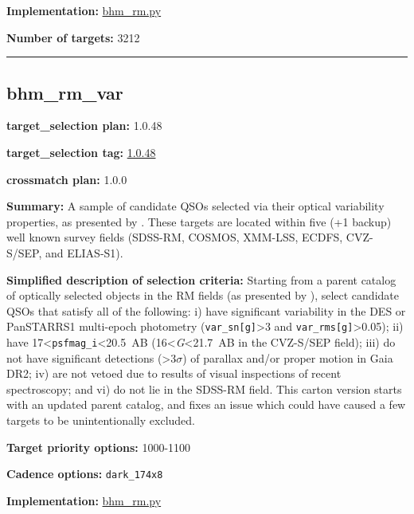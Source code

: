 \noindent\textbf{Implementation:}
\href{https://github.com/sdss/target_selection/blob/1.0.48/python/target_selection/cartons/bhm_rm.py}{bhm\_rm.py}

\noindent\textbf{Number of targets:} 3212

\begin{center}\rule{0.5\linewidth}{0.5pt}\end{center}

\hypertarget{bhm_rm_var_plan1.0.48}{%
\subsection{bhm\_rm\_var}\label{bhm_rm_var_plan1.0.48}}

\noindent\textbf{target\_selection plan:} 1.0.48

\noindent\textbf{target\_selection tag:}
\href{https://github.com/sdss/target_selection/tree/1.0.48/}{1.0.48}

\noindent\textbf{crossmatch plan:} 1.0.0

\noindent\textbf{Summary:} A sample of candidate QSOs selected via their optical
variability properties, as presented by
\citet{Yang2022}. These targets are located within five (+1 backup) well
known survey fields (SDSS-RM, COSMOS, XMM-LSS, ECDFS, CVZ-S/SEP, and
ELIAS-S1).

\noindent\textbf{Simplified description of selection criteria:} Starting from a
parent catalog of optically selected objects in the RM fields (as
presented by
\citealt{Yang2022}), select candidate QSOs that satisfy all of the
following: i) have significant variability in the DES or PanSTARRS1
multi-epoch photometry (\texttt{var\_sn{[}g{]}}\textgreater3 and
\texttt{var\_rms{[}g{]}}\textgreater0.05); ii) have
17\textless{}\texttt{psfmag\_i}\textless20.5~AB
(16\textless{}\emph{G}\textless21.7~AB in the CVZ-S/SEP field); iii) do
not have significant detections (\textgreater3$\sigma$) of parallax and/or
proper motion in Gaia DR2; iv) are not vetoed due to results of visual
inspections of recent spectroscopy; and vi) do not lie in the SDSS-RM
field. This carton version starts with an updated parent catalog, and
fixes an issue which could have caused a few targets to be
unintentionally excluded.


\noindent\textbf{Target priority options:} 1000-1100

\noindent\textbf{Cadence options:} \texttt{dark\_174x8}

\noindent\textbf{Implementation:}
\href{https://github.com/sdss/target_selection/blob/1.0.48/python/target_selection/cartons/bhm_rm.py}{bhm\_rm.py}

